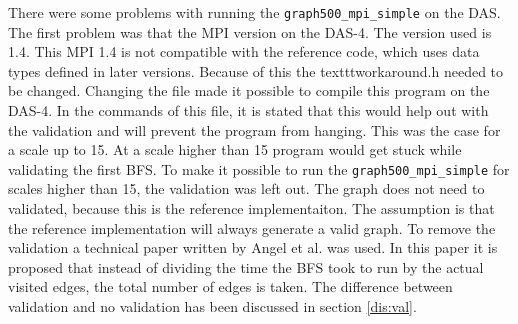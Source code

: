 There were some problems with running the \texttt{graph500\_mpi\_simple} on the DAS. The first problem was that the MPI version on the DAS-4. The version used is 1.4. This MPI 1.4 is not compatible with the reference code, which uses data types defined in later versions. Because of this the texttt{workaround.h} needed to be changed. Changing the file made it possible to compile this program on the DAS-4. In the commands of this file, it is stated that this would help out with the validation and will prevent the program from hanging. This was the case for a scale up to 15. At a scale higher than 15 program would get stuck while
validating the first BFS. To make it possible to run the  \texttt{graph500\_mpi\_simple} for scales higher than 15, the validation was left out. The graph does not need to validated, because this is the reference implementaiton. The assumption is that the reference implementation will always generate a valid graph. To remove the validation a technical paper written by Angel et al.\cite{angel2012graph} was used.
In this paper it is proposed that instead of dividing the time the BFS took to run by the actual visited edges, the total number of edges is taken. The difference between validation and no validation has been discussed in section \ref{dis:val}.
